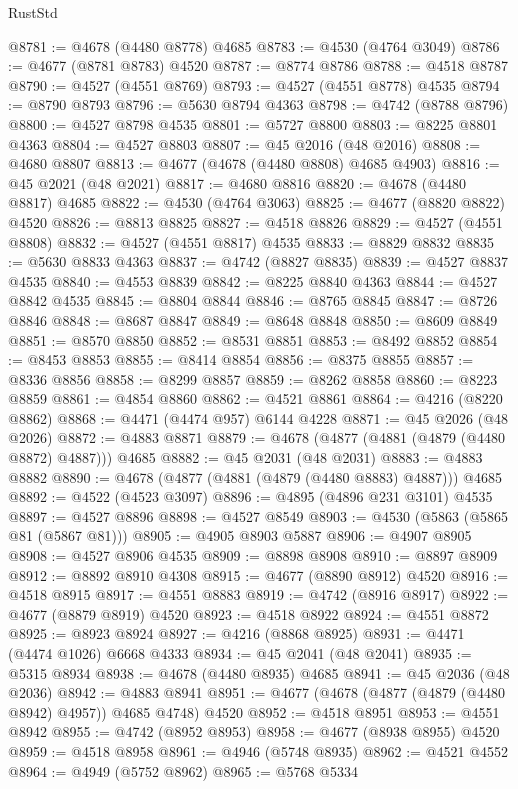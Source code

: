 \begin{lexlean}{RustStd}
\begin{coremodule}
@8781 := @4678 (@4480 @8778) @4685
@8783 := @4530 (@4764 @3049)
@8786 := @4677 (@8781 @8783) @4520
@8787 := @8774 @8786
@8788 := @4518 @8787
@8790 := @4527 (@4551 @8769)
@8793 := @4527 (@4551 @8778) @4535
@8794 := @8790 @8793
@8796 := @5630 @8794 @4363
@8798 := @4742 (@8788 @8796)
@8800 := @4527 @8798 @4535
@8801 := @5727 @8800
@8803 := @8225 @8801 @4363
@8804 := @4527 @8803
@8807 := @45 @2016 (@48 @2016)
@8808 := @4680 @8807
@8813 := @4677 (@4678 (@4480 @8808) @4685 @4903)
@8816 := @45 @2021 (@48 @2021)
@8817 := @4680 @8816
@8820 := @4678 (@4480 @8817) @4685
@8822 := @4530 (@4764 @3063)
@8825 := @4677 (@8820 @8822) @4520
@8826 := @8813 @8825
@8827 := @4518 @8826
@8829 := @4527 (@4551 @8808)
@8832 := @4527 (@4551 @8817) @4535
@8833 := @8829 @8832
@8835 := @5630 @8833 @4363
@8837 := @4742 (@8827 @8835)
@8839 := @4527 @8837 @4535
@8840 := @4553 @8839
@8842 := @8225 @8840 @4363
@8844 := @4527 @8842 @4535
@8845 := @8804 @8844
@8846 := @8765 @8845
@8847 := @8726 @8846
@8848 := @8687 @8847
@8849 := @8648 @8848
@8850 := @8609 @8849
@8851 := @8570 @8850
@8852 := @8531 @8851
@8853 := @8492 @8852
@8854 := @8453 @8853
@8855 := @8414 @8854
@8856 := @8375 @8855
@8857 := @8336 @8856
@8858 := @8299 @8857
@8859 := @8262 @8858
@8860 := @8223 @8859
@8861 := @4854 @8860
@8862 := @4521 @8861
@8864 := @4216 (@8220 @8862)
@8868 := @4471 (@4474 @957) @6144 @4228
@8871 := @45 @2026 (@48 @2026)
@8872 := @4883 @8871
@8879 := @4678 (@4877 (@4881 (@4879 (@4480 @8872) @4887))) @4685
@8882 := @45 @2031 (@48 @2031)
@8883 := @4883 @8882
@8890 := @4678 (@4877 (@4881 (@4879 (@4480 @8883) @4887))) @4685
@8892 := @4522 (@4523 @3097)
@8896 := @4895 (@4896 @231 @3101) @4535
@8897 := @4527 @8896
@8898 := @4527 @8549
@8903 := @4530 (@5863 (@5865 @81 (@5867 @81)))
@8905 := @4905 @8903 @5887
@8906 := @4907 @8905
@8908 := @4527 @8906 @4535
@8909 := @8898 @8908
@8910 := @8897 @8909
@8912 := @8892 @8910 @4308
@8915 := @4677 (@8890 @8912) @4520
@8916 := @4518 @8915
@8917 := @4551 @8883
@8919 := @4742 (@8916 @8917)
@8922 := @4677 (@8879 @8919) @4520
@8923 := @4518 @8922
@8924 := @4551 @8872
@8925 := @8923 @8924
@8927 := @4216 (@8868 @8925)
@8931 := @4471 (@4474 @1026) @6668 @4333
@8934 := @45 @2041 (@48 @2041)
@8935 := @5315 @8934
@8938 := @4678 (@4480 @8935) @4685
@8941 := @45 @2036 (@48 @2036)
@8942 := @4883 @8941
@8951 := @4677 (@4678 (@4877 (@4879 (@4480 @8942) @4957)) @4685 @4748) @4520
@8952 := @4518 @8951
@8953 := @4551 @8942
@8955 := @4742 (@8952 @8953)
@8958 := @4677 (@8938 @8955) @4520
@8959 := @4518 @8958
@8961 := @4946 (@5748 @8935)
@8962 := @4521 @4552
@8964 := @4949 (@5752 @8962)
@8965 := @5768 @5334

\end{coremodule}
\end{lexlean}
